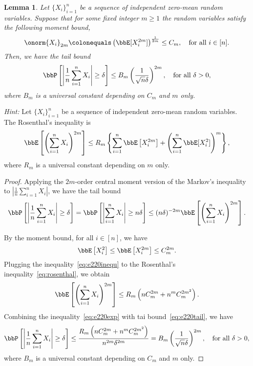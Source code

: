 \documentclass[11pt]{article}
\newcommand{\of}[1]{\left(#1\right)}
\newcommand{\off}[1]{\left[#1\right]}
\newcommand{\offf}[1]{\left\{#1\right\}}
\newcommand{\aabs}[1]{\left|#1\right|}
\theoremstyle{plain}
\newtheorem{lem}{Lemma}
\theoremstyle{definition}
\begin{document}
\begin{lem}
	Let $\{X_i\}_{i=1}^n$ be a sequence of independent zero-mean random variables. Suppose that for some fixed integer $m \geq 1$ the random variables satisfy the following moment bound,
\begin{equation}\label{eq:e220mom}
	\onorm{X_i}_{2m} \colonequals \of{\bbE[X^{2m}_i] }^{\frac{1}{2m}} \leq C_m, \quad \text{for all } i \in [n].
\end{equation}
Then, we have the tail bound
\begin{equation}
	\bbP \off{\aabs{ \frac{1}{n}  \sum_{i=1}^n X_i } \geq \delta } \leq B_m \of{\frac{1}{\sqrt{n} \delta}}^{2m}, \quad \text{for all } \delta >0,
\end{equation}
where $B_m$ is a universal constant depending on $C_m$ and $m$ only.
\end{lem}

\textit{Hint:} Let $\{X_i\}_{i=1}^n$ be a sequence of independent zero-mean random variables. The Rosenthal’s inequality is
\begin{equation}\label{eq:rosenthal}
	\bbE \off{\of{\sum_{i=1}^n X_i}^{2m}} \leq R_m \offf{\sum_{i=1}^n \bbE \off{X^{2m}_i} + \of{\sum_{i=1}^n \bbE [X^2_i]}^m },
\end{equation}
 where $R_m$ is a universal constant depending on $m$ only.
 
 \begin{proof}
 	Applying the $2m$-order central moment version of the Markov's inequality to $\aabs{ \frac{1}{n}  \sum_{i=1}^n X_i } $, we have the tail bound
 	\begin{equation}\label{eq:e220tail}
 		\bbP \off{\aabs{ \frac{1}{n}  \sum_{i=1}^n X_i } \geq \delta } = \bbP \off{\aabs{  \sum_{i=1}^n X_i } \geq n \delta } \leq (n\delta)^{-2m} \bbE \off{ \of{\sum_{i=1}^n X_i}^{2m} }.
 	\end{equation}
 	
 	By the moment bound, for all $i\in [n]$, we have
 	\begin{equation}\label{eq:e220inequ}
 		\bbE \off{X^2_i}  \leq \bbE \off{X^{2m}_i} \leq C^{2m}_m.
 	\end{equation}
 	Plugging the inequality~\eqref{eq:e220inequ} to the Rosenthal's inequality~\eqref{eq:rosenthal}, we obtain
 	\begin{equation}\label{eq:e220exp}
 		\bbE \off{\of{\sum_{i=1}^n X_i}^{2m}} \leq R_m\of{nC^{2m}_m  + n^m C^{2m^2}_m  }. 
 	\end{equation}
 	Combining the inequality~\eqref{eq:e220exp} with tai bound~\eqref{eq:e220tail}, we have
 	\begin{equation}
 		\bbP \off{\aabs{ \frac{1}{n}  \sum_{i=1}^n X_i } \geq \delta } \leq \frac{R_m\of{nC^{2m}_m  + n^m C^{2m^2}_m  } }{n^{2m} \delta^{2m}} = B_m\of{ \frac{1}{\sqrt{n} \delta}}^{2m}, \quad \text{for all }\delta > 0,
 	\end{equation}
 	where $B_m$ is a universal constant depending on $C_m$ and $m$ only.
 \end{proof}
 
\end{document}
